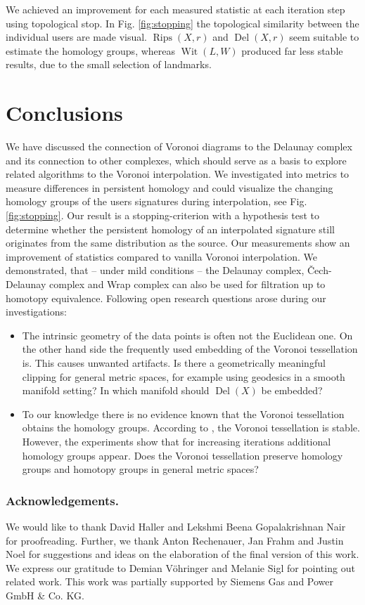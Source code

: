 \documentclass[runningheads]{llncs}
\DeclareMathOperator{\Rips}{\text{Rips}}
\DeclareMathOperator{\Del}{\text{Del}}
\DeclareMathOperator{\Wit}{\text{Wit}}
\begin{document}
We achieved an improvement for each measured statistic at each iteration step using topological stop. In Fig. \ref{fig:stopping} the topological similarity between the individual users are made visual. $\Rips(X,r)$ and $\Del(X,r)$ seem suitable to estimate the homology groups, whereas $\Wit(L,W)$ produced far less stable results, due to the small selection of landmarks.

\section{Conclusions}
\label{sec:conclusion}
We have discussed the connection of Voronoi diagrams to the Delaunay complex and its connection to other complexes, which should serve as a basis to explore related algorithms to the Voronoi interpolation. We investigated into metrics to measure differences in persistent homology and could visualize the changing homology groups of the users signatures during interpolation, see Fig. \ref{fig:stopping}.
Our result is a stopping-criterion with a hypothesis test to determine whether the persistent homology of an interpolated signature still originates from the same distribution as the source. Our measurements show an improvement of statistics compared to vanilla Voronoi interpolation. We demonstrated, that -- under mild conditions -- the Delaunay complex, \v{C}ech-Delaunay complex and Wrap complex can also be used for filtration up to homotopy equivalence. Following open research questions arose during our investigations:
\begin{itemize}
  \item The intrinsic geometry of the data points is often not the Euclidean one. On the other hand side the frequently used embedding of the Voronoi tessellation is. This causes unwanted artifacts. Is there a geometrically meaningful clipping for general metric spaces, for example using geodesics in a smooth manifold setting? In which manifold should $\Del(X)$ be embedded?
  \item To our knowledge there is no evidence known that the Voronoi tessellation obtains the homology groups. According to \cite{reem2011geometric}, the Voronoi tessellation is stable. However, the experiments show that for increasing iterations additional homology groups appear. Does the Voronoi tessellation preserve homology groups and homotopy groups in general metric spaces?
\end{itemize}

\subsubsection*{Acknowledgements.} We would like to thank David Haller and Lekshmi Beena Gopalakrishnan Nair for proofreading. Further, we thank Anton Rechenauer, Jan Frahm and Justin Noel for suggestions and ideas on the elaboration of the final version of this work. We express our gratitude to Demian Vöhringer and Melanie Sigl for pointing out related work. This work was partially supported by Siemens Gas and Power GmbH \& Co. KG.
\end{document}

